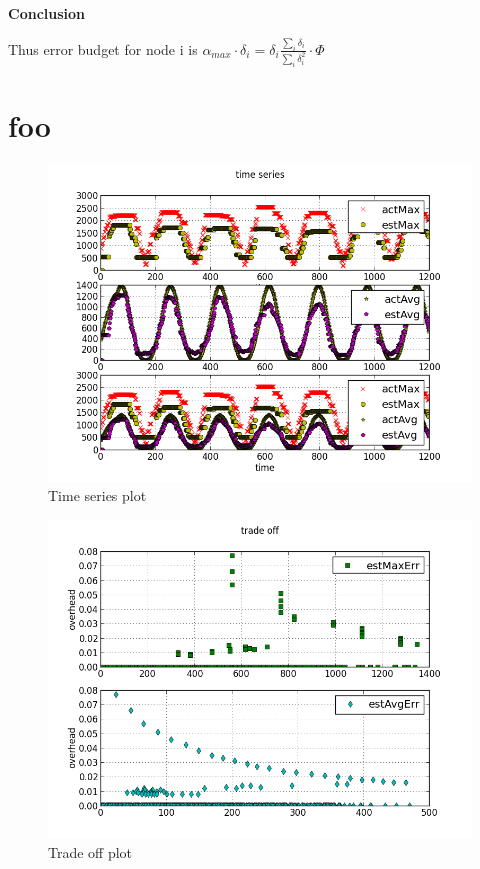 \documentclass[a4paper, smallheadings,english]{scrartcl}
\begin{document}
\textbf{Conclusion}

Thus error budget for node i is $\alpha_{max} \cdot \delta_i = \delta_i \frac{\sum_i \delta_i}{\sum_i \delta_i^2} \cdot \Phi$

\section{foo}

\begin{figure}[h!]
    \begin{center}
        \includegraphics[scale=0.7]{plots/time_series}
    \end{center}
    \caption{Time series plot}
    \label{fig:ts}
\end{figure}
\begin{figure}[h!]
    \begin{center}
        \includegraphics[scale=0.7]{plots/trade_off}
    \end{center}
    \caption{Trade off plot}
    \label{fig:to}
\end{figure}
\end{document}
